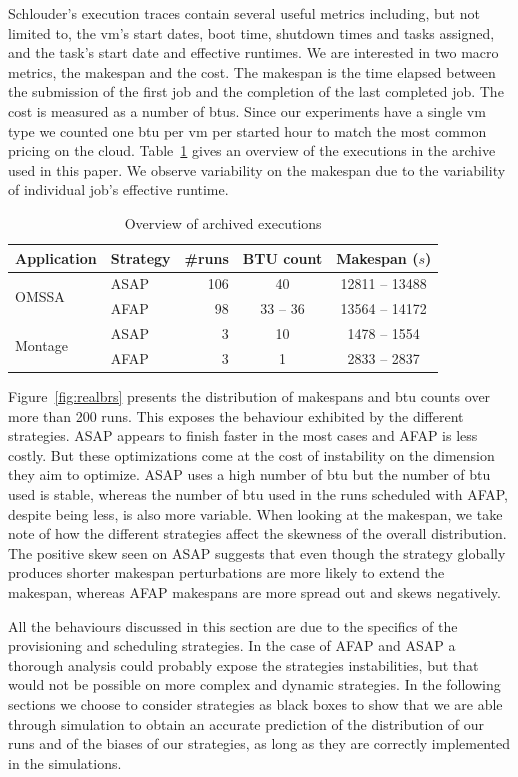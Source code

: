 \documentclass[10pt,conference,compsocconf]{IEEEtran}
\begin{document}
Schlouder's execution traces contain several useful metrics including, but not
limited to, the \ac{vm}'s start dates, boot time, shutdown times and tasks
assigned, and the task's start date and effective runtimes. We are interested in
two macro metrics, the makespan and the cost.  The makespan is the time elapsed
between the submission of the first job and the completion of the last completed
job. The cost is measured as a number of \acp{btu}. Since our experiments have a
single \ac{vm} type we counted one \ac{btu} per \ac{vm} per started hour to
match the most common pricing on the cloud. Table~\ref{tab:nbruns} gives an
overview of the executions in the archive used in this paper. We observe
variability on the makespan due to the variability of individual job's effective
runtime.
\begin{table}
	\centering
	\caption{Overview of archived executions}\label{tab:nbruns}
	\begin{tabular}{llrcc}
		\toprule
		Application&Strategy&\#runs&BTU count&Makespan ($s$)\\
		\midrule
		\multirow{2}{*}{OMSSA}&ASAP&106&40&12811 -- 13488\\
				      &AFAP&98&33 -- 36&13564 -- 14172\\
		\midrule
		\multirow{2}{*}{Montage}&ASAP&3&10&1478 -- 1554\\
					&AFAP&3&1&2833 -- 2837\\
		\bottomrule
	\end{tabular}
\end{table}


Figure~\ref{fig:realbrs}  presents the  distribution of  makespans and  \ac{btu}
counts over  more than  200 runs.  This exposes the  behaviour exhibited  by the
different strategies. ASAP  appears to finish faster in the  most cases and AFAP
is less costly. But  these optimizations come at the cost  of instability on the
dimension they  aim to  optimize. ASAP uses  a high number  of \ac{btu}  but the
number of \ac{btu}  used is stable, whereas  the number of \ac{btu}  used in the
runs  scheduled with  AFAP,  despite being  less, is  also  more variable.  When
looking at the makespan, we take note of how the different strategies affect the
skewness of  the overall distribution. The  positive skew seen on  ASAP suggests
that even though  the strategy globally produces  shorter makespan perturbations
are more likely  to extend the makespan, whereas AFAP  makespans are more spread
out and skews negatively.

All the behaviours discussed in this section are due to the specifics of the
provisioning and scheduling strategies. In the case of AFAP and ASAP a thorough
analysis could probably expose the strategies instabilities, but that would not
be possible on more complex and dynamic strategies. In the following sections we
choose to consider strategies as black boxes to show that we are able through
simulation to obtain an accurate prediction of the distribution of our runs
and of the biases of our strategies, as long as they are correctly implemented
in the simulations.
\end{document}
